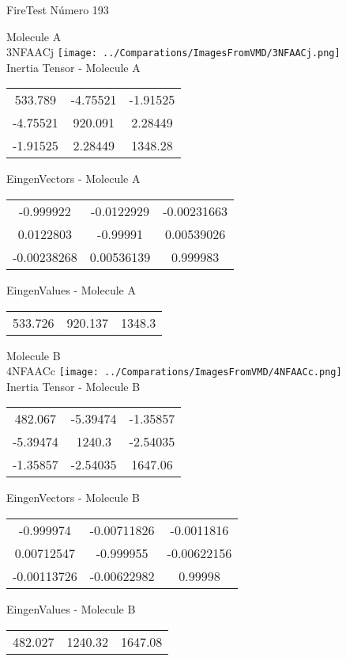 \vtab[-2cm]
\begin{center}
{\large FireTest \tab Número 193}
\end{center}
\begin{multicols}{2}
\begin{center}

Molecule A \\ 
3NFAACj
\texttt{[image: ../Comparations/ImagesFromVMD/3NFAACj.png]}
\\
Inertia Tensor - Molecule A \\
\vtab

\begin{tabular}{|c c c|}
533.789	 & 	-4.75521	 & 	-1.91525	 \\
-4.75521	 & 	920.091	 & 	2.28449	 \\
-1.91525	 & 	2.28449	 & 	1348.28
\end{tabular}

\vtab
 EingenVectors - Molecule A     \\
\vtab
\begin{tabular}{|c c c|}
-0.999922	 & 	-0.0122929	 & 	-0.00231663	 \\
0.0122803	 & 	-0.99991	 & 	0.00539026	 \\
-0.00238268	 & 	0.00536139	 & 	0.999983
\end{tabular}

\vtab
 EingenValues - Molecule A     \\
\vtab
\begin{tabular}{|c c c|}
533.726	 & 	920.137	 & 	1348.3	 \\
\end{tabular}
\columnbreak

Molecule B \\ 
4NFAACc
\texttt{[image: ../Comparations/ImagesFromVMD/4NFAACc.png]}
\\
Inertia Tensor - Molecule B \\
\vtab

\begin{tabular}{|c c c|}
482.067	 & 	-5.39474	 & 	-1.35857	 \\
-5.39474	 & 	1240.3	 & 	-2.54035	 \\
-1.35857	 & 	-2.54035	 & 	1647.06
\end{tabular}

\vtab
 EingenVectors - Molecule B     \\
\vtab
\begin{tabular}{|c c c|}
-0.999974	 & 	-0.00711826	 & 	-0.0011816	 \\
0.00712547	 & 	-0.999955	 & 	-0.00622156	 \\
-0.00113726	 & 	-0.00622982	 & 	0.99998
\end{tabular}

\vtab
 EingenValues - Molecule B     \\
\vtab
\begin{tabular}{|c c c|}
482.027	 & 	1240.32	 & 	1647.08	 \\
\end{tabular}

\end{center}
\end{multicols}
